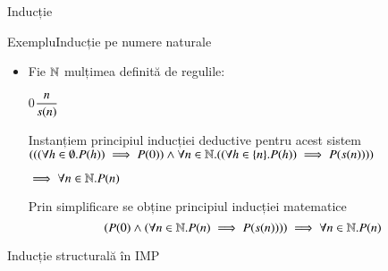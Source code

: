 \documentclass[xcolor=pdftex,romanian,colorlinks]{beamer}
\begin{document}
\begin{section}{Inducție}
%
%
%

\begin{frame}{Exemplu}{Inducție pe numere naturale}

\begin{itemize}
\item Fie $\mathbb{N}$ mulțimea definită de regulile:

\hfill $0$\hfill $\displaystyle\reg{s(n)}{n}{}$\hfill\;

\vitem Instanțiem principiul inducției deductive pentru acest sistem
$(((\forall h\in\emptyset.P(h)) \implies P(0))\wedge\forall n\in\mathbb{N}.((\forall h\in\{n\}.P(h)) \implies P(s(n))))$

\hfill $\implies \forall n\in\mathbb{N}.P(n)$

\vitem Prin simplificare se obține principiul inducției matematice
\[\left(P(0) \wedge (\forall n\in\mathbb{N}. P(n) \implies P(s(n)))\right)\implies \forall n\in\mathbb{N}. P(n)\]
\end{itemize}
\end{frame}

\begin{subsection}{Inducție structurală în IMP}


\end{subsection}
\end{section}
\end{document}
